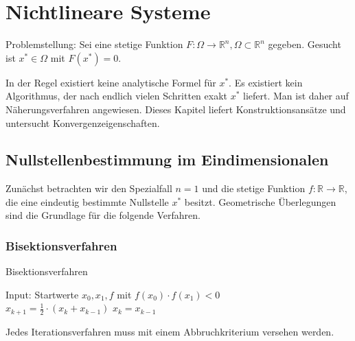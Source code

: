\section{Nichtlineare Systeme}

Problemstellung: Sei eine stetige Funktion
$F: \Omega \longrightarrow \mathbb{R}^n, \Omega \subset \mathbb{R}^n$ gegeben.
Gesucht ist $x^*\in \Omega$ mit $F(x^*)=0$.
\newline

\begin{bemerkung}
In der Regel existiert keine analytische Formel für $x^*$.
Es existiert kein Algorithmus, der nach endlich vielen Schritten exakt $x^*$
liefert.  Man ist daher auf Näherungsverfahren angewiesen.  Dieses Kapitel
liefert Konstruktionsansätze und untersucht Konvergenzeigenschaften.
\end{bemerkung}

\subsection{Nullstellenbestimmung im Eindimensionalen}

Zunächst betrachten wir den Spezialfall $n=1$ und die stetige Funktion $f:
\mathbb{R} \longrightarrow \mathbb{R}$, die eine eindeutig bestimmte Nullstelle
$x^*$ besitzt. Geometrische Überlegungen sind die Grundlage für die folgende
Verfahren.


\subsubsection{Bisektionsverfahren}

\begin{algorithm}
\caption{Bisektionsverfahren}
\begin{algorithmic}
\STATE Input: Startwerte $x_0, x_1, f$ mit $f(x_0) \cdot f(x_1) <0$\\
  \STATE $x_{k+1} = \frac{1}{2} \cdot (x_k + x_{k-1})$
    \STATE $x_k = x_{k-1}$
  \ENDIF
\ENDFOR
\end{algorithmic}
\end{algorithm}


\begin{bemerkung}
Jedes Iterationsverfahren muss mit einem Abbruchkriterium versehen werden.
\end{bemerkung}


